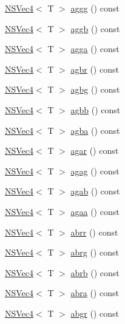 \begin{DoxyCompactItemize}
\item 
\hyperlink{structNSVec4}{N\-S\-Vec4}$<$ T $>$ \hyperlink{structNSVec4_ab9b3049a9d1992fbbc31d27e42618751}{aggg} () const 
\item 
\hyperlink{structNSVec4}{N\-S\-Vec4}$<$ T $>$ \hyperlink{structNSVec4_a8795e3711a1f2eba4b12cc4106c063f7}{aggb} () const 
\item 
\hyperlink{structNSVec4}{N\-S\-Vec4}$<$ T $>$ \hyperlink{structNSVec4_a7eafb388b098b09674f702e91d0fbdb4}{agga} () const 
\item 
\hyperlink{structNSVec4}{N\-S\-Vec4}$<$ T $>$ \hyperlink{structNSVec4_ad24ca22cfc6f20fa47e8f7c5e56227c9}{agbr} () const 
\item 
\hyperlink{structNSVec4}{N\-S\-Vec4}$<$ T $>$ \hyperlink{structNSVec4_a0c59b4cdd6ea96696059c091d9bd0cf3}{agbg} () const 
\item 
\hyperlink{structNSVec4}{N\-S\-Vec4}$<$ T $>$ \hyperlink{structNSVec4_a8a531873f9a146343b1be78f605a9934}{agbb} () const 
\item 
\hyperlink{structNSVec4}{N\-S\-Vec4}$<$ T $>$ \hyperlink{structNSVec4_a418df1221c27d6f8aa2db763289a3c7e}{agba} () const 
\item 
\hyperlink{structNSVec4}{N\-S\-Vec4}$<$ T $>$ \hyperlink{structNSVec4_a309fe0397dc180e0d54036fa7cdb9939}{agar} () const 
\item 
\hyperlink{structNSVec4}{N\-S\-Vec4}$<$ T $>$ \hyperlink{structNSVec4_a67721362ab3d25779b356b6e4cfd9e0c}{agag} () const 
\item 
\hyperlink{structNSVec4}{N\-S\-Vec4}$<$ T $>$ \hyperlink{structNSVec4_ac4168431277e95a40c582238e1de28cc}{agab} () const 
\item 
\hyperlink{structNSVec4}{N\-S\-Vec4}$<$ T $>$ \hyperlink{structNSVec4_a833a2de6168efcc6e4c499e80e6afdaf}{agaa} () const 
\item 
\hyperlink{structNSVec4}{N\-S\-Vec4}$<$ T $>$ \hyperlink{structNSVec4_a5fc3cd074dc666cd10bedd4065da6603}{abrr} () const 
\item 
\hyperlink{structNSVec4}{N\-S\-Vec4}$<$ T $>$ \hyperlink{structNSVec4_ac1319270c82a57f60bcac61438a145b2}{abrg} () const 
\item 
\hyperlink{structNSVec4}{N\-S\-Vec4}$<$ T $>$ \hyperlink{structNSVec4_afa33d05d9ba2c8900d48a3a76cad8e46}{abrb} () const 
\item 
\hyperlink{structNSVec4}{N\-S\-Vec4}$<$ T $>$ \hyperlink{structNSVec4_a75ae7af49a7c0310651dc9482fc1f883}{abra} () const 
\item 
\hyperlink{structNSVec4}{N\-S\-Vec4}$<$ T $>$ \hyperlink{structNSVec4_a0c43fac5ab2e109dbc82b4bfb21013e4}{abgr} () const 

\end{DoxyCompactItemize}
